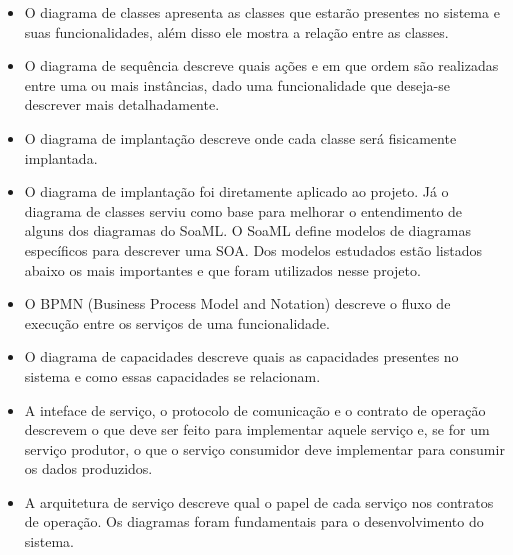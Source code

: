 \documentclass[12pt]{report}
\begin{document}
\begin{itemize}
\item O diagrama de classes apresenta as classes que estarão presentes no sistema e suas funcionalidades, além disso ele mostra a relação entre as classes.
\item O diagrama de sequência descreve quais ações e em que ordem são realizadas entre uma ou mais instâncias, dado uma funcionalidade que deseja-se descrever mais detalhadamente.
\item O diagrama de implantação descreve onde cada classe será fisicamente implantada.
\item O diagrama de implantação foi diretamente aplicado ao projeto. Já o diagrama de classes serviu como base para melhorar o entendimento de alguns dos diagramas do SoaML. O SoaML define modelos de diagramas específicos para descrever uma SOA. Dos modelos estudados estão listados abaixo os mais importantes e que foram utilizados nesse projeto.
\item O BPMN (Business Process Model and Notation) descreve o fluxo de execução entre os serviços de uma funcionalidade.
\item O diagrama de capacidades descreve quais as capacidades presentes no sistema e como essas capacidades se relacionam.
\item A inteface de serviço, o protocolo de comunicação e o contrato de operação descrevem o que deve ser feito para implementar aquele serviço e, se for um serviço produtor, o que o serviço consumidor deve implementar para consumir os dados produzidos.
\item A arquitetura de serviço descreve qual o papel de cada serviço nos contratos de operação.
Os diagramas foram fundamentais para o desenvolvimento do sistema.
\end{itemize}
\end{document}
